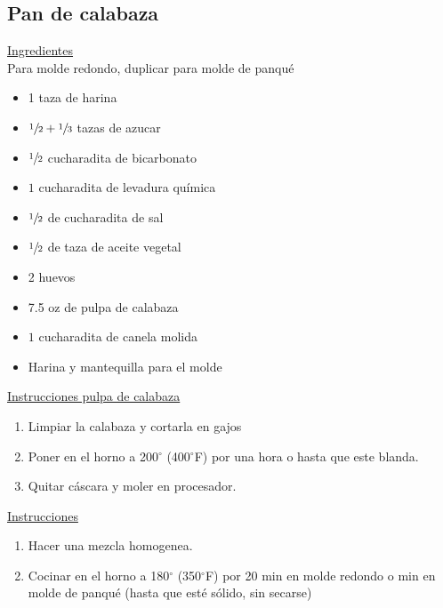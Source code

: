\subsection{Pan de calabaza}

\underline{Ingredientes}\\
Para molde redondo, duplicar para molde de panqué
\begin{itemize}
\item 1 taza de harina
\item $\sfrac{1}{2}+\sfrac{1}{3}$ tazas de azucar
\item $\sfrac{1}{2}$ cucharadita de bicarbonato
\item $1$ cucharadita de levadura qu\'imica
\item $\sfrac{1}{2}$ de cucharadita de sal
\item $\sfrac{1}{2}$ de taza de aceite vegetal
\item 2 huevos
\item 7.5 oz de pulpa de calabaza
\item $1$ cucharadita de canela molida
\item Harina y mantequilla para el molde
\end{itemize}

\underline{Instrucciones pulpa de calabaza}
\begin{enumerate}
\item Limpiar la calabaza y cortarla en gajos
\item Poner en el horno a 200$^\circ$ (400$^\circ$F) por una hora o hasta que este blanda.
\item Quitar c\'ascara y moler en procesador.
\end{enumerate}

\underline{Instrucciones}
\begin{enumerate}
\item Hacer una mezcla homogenea.
\item Cocinar en el horno a 180$^\circ$ (350$^\circ$F) por 20 min en molde redondo o  min en molde de panqu\'e (hasta que est\'e s\'olido, sin secarse)\\
\end{enumerate}
